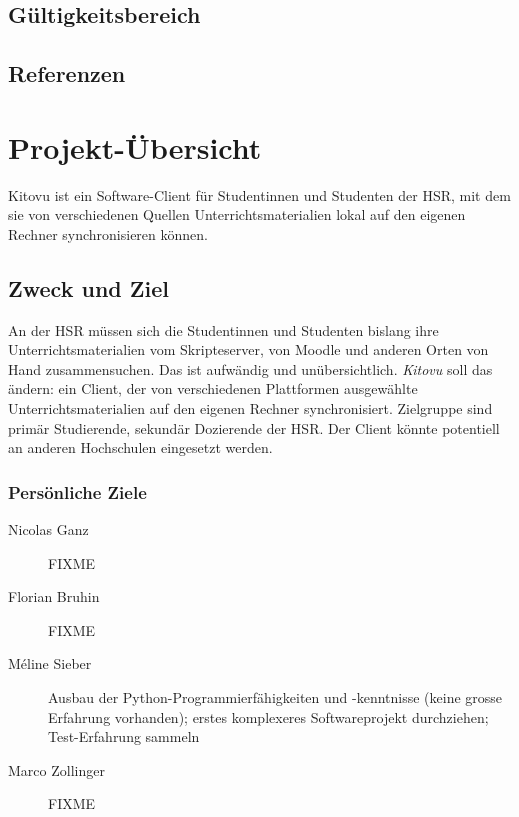 \documentclass[a4paper]{article}
\begin{document}
\subsection{Gültigkeitsbereich}
\blindtext

\subsection{Referenzen}
\blindtext

\section{Projekt-Übersicht}
Kitovu ist ein Software-Client für Studentinnen und Studenten der HSR, mit dem sie von verschiedenen Quellen Unterrichtsmaterialien lokal auf den eigenen Rechner synchronisieren können.

\subsection{Zweck und Ziel}
An der HSR müssen sich die Studentinnen und Studenten bislang ihre Unterrichtsmaterialien vom Skripteserver, von Moodle und anderen Orten von Hand zusammensuchen. Das ist aufwändig und unübersichtlich. \emph{Kitovu} soll das ändern: ein Client, der von verschiedenen Plattformen ausgewählte Unterrichtsmaterialien auf den eigenen Rechner synchronisiert.
Zielgruppe sind primär Studierende, sekundär Dozierende der HSR. Der Client könnte potentiell an anderen Hochschulen eingesetzt werden.

\subsubsection{Persönliche Ziele}
\begin{description}
\item[Nicolas Ganz] FIXME
\item[Florian Bruhin] FIXME
\item[Méline Sieber] Ausbau der Python-Programmierfähigkeiten und -kenntnisse (keine grosse Erfahrung vorhanden); erstes komplexeres Softwareprojekt durchziehen; Test-Erfahrung sammeln
\item[Marco Zollinger] FIXME
\end{description}
\end{document}

